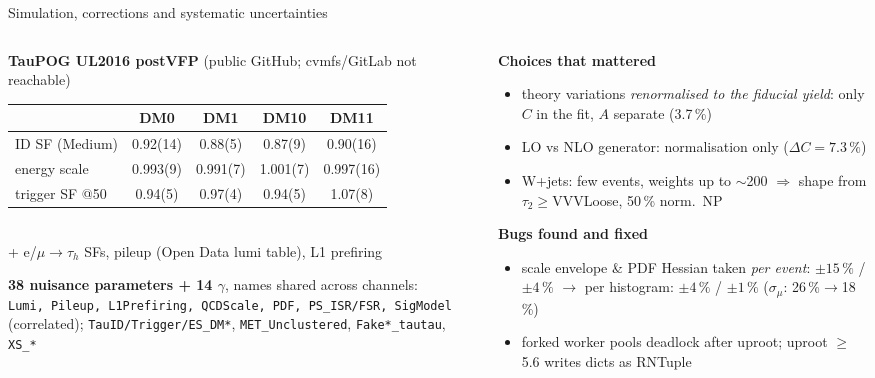 \documentclass[aspectratio=169,9pt]{beamer}
\begin{document}
\begin{frame}{Simulation, corrections and systematic uncertainties}
\begin{columns}[T]
\begin{column}{0.52\textwidth}
\footnotesize
\textbf{TauPOG UL2016 postVFP} (public GitHub; cvmfs/GitLab not reachable)\\[1mm]
\begin{tabular}{@{}lcccc@{}}
\toprule
 & DM0 & DM1 & DM10 & DM11 \\
\midrule
ID SF (Medium) & 0.92(14) & 0.88(5) & 0.87(9) & 0.90(16) \\
energy scale & 0.993(9) & 0.991(7) & 1.001(7) & 0.997(16) \\
trigger SF @50 & 0.94(5) & 0.97(4) & 0.94(5) & 1.07(8) \\
\bottomrule
\end{tabular}\\[1mm]
+ e/$\mu\rightarrow\tau_h$ SFs, pileup (Open Data lumi table), L1 prefiring

\medskip
\textbf{38 nuisance parameters + 14 $\gamma$}, names shared across channels:\\
\texttt{Lumi, Pileup, L1Prefiring, QCDScale, PDF, PS\_ISR/FSR, SigModel} (correlated);
\texttt{TauID/Trigger/ES\_DM*}, \texttt{MET\_Unclustered}, \texttt{Fake*\_tautau}, \texttt{XS\_*}
\end{column}
\begin{column}{0.46\textwidth}
\small
\textbf{Choices that mattered}
\begin{itemize}\setlength\itemsep{2pt}
\item theory variations \emph{renormalised to the fiducial yield}: only $C$ in the fit, $A$ separate (3.7\,\%)
\item LO vs NLO generator: normalisation only ($\Delta C = 7.3\,\%$)
\item W+jets: few events, weights up to $\sim$200 $\Rightarrow$ shape from $\tau_2\geq$VVVLoose, 50\,\% norm.\ NP
\end{itemize}
\textbf{Bugs found and fixed}
\begin{itemize}\setlength\itemsep{2pt}\footnotesize
\item scale envelope \& PDF Hessian taken \emph{per event}: $\pm15\,\%$ / $\pm4\,\%$ $\rightarrow$ per histogram: $\pm4\,\%$ / $\pm1\,\%$ \quad ($\sigma_\mu$: 26\,\%$\rightarrow$18\,\%)
\item forked worker pools deadlock after uproot; uproot $\geq$5.6 writes dicts as RNTuple
\end{itemize}
\end{column}
\end{columns}
\end{frame}
\end{document}
